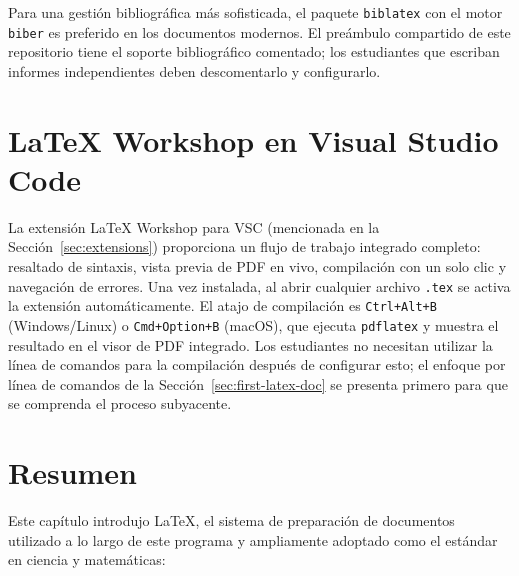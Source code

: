 Para una gestión bibliográfica más sofisticada, el paquete
\texttt{biblatex} con el motor \texttt{biber} es preferido en los
documentos modernos. El preámbulo compartido de este repositorio
tiene el soporte bibliográfico comentado; los estudiantes que
escriban informes independientes deben descomentarlo y configurarlo.

\section{LaTeX Workshop en Visual Studio Code}
\label{sec:latex-workshop}

La extensión LaTeX Workshop para VSC (mencionada en la
Sección~\ref{sec:extensions}) proporciona un flujo de trabajo
integrado completo: resaltado de sintaxis, vista previa de PDF en
vivo, compilación con un solo clic y navegación de errores. Una vez
instalada, al abrir cualquier archivo \texttt{.tex} se activa la
extensión automáticamente. El atajo de compilación es
\texttt{Ctrl+Alt+B} (Windows/Linux) o \texttt{Cmd+Option+B} (macOS),
que ejecuta \texttt{pdflatex} y muestra el resultado en el visor de
PDF integrado. Los estudiantes no necesitan utilizar la línea de
comandos para la compilación después de configurar esto; el enfoque
por línea de comandos de la Sección~\ref{sec:first-latex-doc} se
presenta primero para que se comprenda el proceso subyacente.

\section{Resumen}
\label{sec:latex-summary}

Este capítulo introdujo \LaTeX{}, el sistema de preparación de
documentos utilizado a lo largo de este programa y ampliamente
adoptado como el estándar en ciencia y matemáticas:

